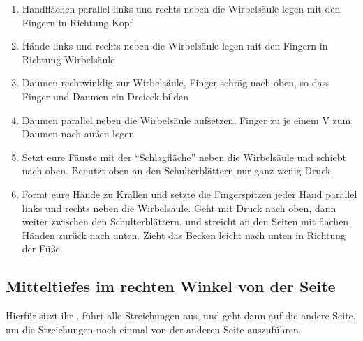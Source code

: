 \begin{enumerate}
  \item {} Handflächen parallel links und rechts neben die Wirbelsäule legen mit den Fingern in Richtung Kopf
  \item {} Hände links und rechts neben die Wirbelsäule legen mit den Fingern in Richtung Wirbelsäule
  \item {} Daumen rechtwinklig zur Wirbelsäule, Finger schräg nach oben, so dass Finger und Daumen ein Dreieck bilden
  \item {} Daumen parallel neben die Wirbelsäule aufsetzen, Finger zu je einem V zum Daumen nach außen legen
  \item {} Setzt eure Fäuste mit der ``Schlagfläche'' neben die Wirbelsäule und schiebt nach oben. Benutzt oben an den Schulterblättern nur ganz wenig Druck.
  \item {} Formt eure Hände zu Krallen und setzte die Fingerspitzen jeder Hand parallel links und rechts neben die Wirbelsäule. Geht mit Druck nach oben, dann weiter zwischen den Schulterblättern, und streicht an den Seiten mit flachen Händen zurück nach unten. Zieht das Becken leicht nach unten in Richtung der Füße.
\end{enumerate}


\subsection{Mitteltiefes im rechten Winkel von der Seite}
Hierfür sitzt ihr , führt alle Streichungen aus, und geht dann auf die andere Seite, um die Streichungen noch einmal von der anderen Seite auszuführen.

